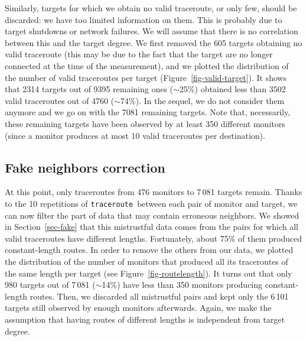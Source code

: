 \documentclass[conference]{IEEEtran}
\newcommand{\traceroute}{{\tt traceroute}}
\begin{document}
Similarly, targets for which we obtain no valid traceroute, or only few, should be discarded: we have too limited information on them. This is probably due to target shutdowns or network failures. We will assume that there is no correlation between this and the target degree. We first removed the 605 targets obtaining no valid traceroute (this may be due to the fact that the target are no longer connected at the time of the measurement), and we plotted the distribution of the number of valid traceroutes per target (Figure~\ref{fig-valid-target}). It shows that 2314 targets out of 9395 remaining ones ($\sim$25\%) obtained less than 3502 valid traceroutes out of 4760 ($\sim$74\%). In the sequel, we do not consider them anymore and we go on with the 7081 remaining targets. Note that, necessarily, these remaining targets have been observed by at least 350 different monitors (since a monitor produces at most 10 valid traceroutes per destination).





\subsection{Fake neighbors correction}

At this point, only traceroutes from 476 monitors to 7\,081 targets remain. Thanks to the 10 repetitions of \traceroute\ between each pair of monitor and target, we can now filter the part of data that may contain erroneous neighbors. We showed in Section~\ref{sec-fake} that this mistrustful data comes from the pairs for which all valid traceroutes have different lengths. Fortunately, about 75\% of them produced constant-length routes. In order to remove the others from our data, we plotted the distribution of the number of monitors that produced all its traceroutes of the same length per target (see Figure~\ref{fig-routelength}). It turns out that only 980 targets out of 7\,081 ($\sim$14\%) have less than 350 monitors producing constant-length routes.
Then, we discarded all mistrustful pairs and kept only the 6\,101 targets still observed by enough monitors afterwards. Again, we make the assumption that having routes of different lengths is independent from target degree.
\end{document}
